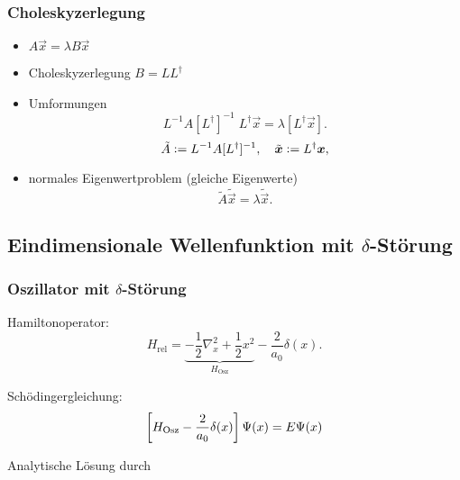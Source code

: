 \documentclass[ngerman, fleqn]{beamer}
\begin{document}
\begin{frame}
    \frametitle{Choleskyzerlegung}

    \begin{itemize}
        \item
            $A \vec x = \lambda B \vec x$

        \item
            Choleskyzerlegung $B = L L^\dagger$ 

        \item
            Umformungen
            \[
                L^{-1} A [L^\dagger]^{-1} \; L^\dagger \vec x
                =
                \lambda [L^\dagger \vec x].
            \]
            \[
                \tilde{A} := L^{-1} A [L^\dagger]^{-1}
                ,\quad
                \tilde{\boldsymbol{x}} := L^\dagger \boldsymbol{x},
            \]

        \item
            normales Eigenwertproblem (gleiche Eigenwerte)
            \[
                \tilde{A} \tilde{\vec x} = \lambda \tilde{\vec x}.
            \]
    \end{itemize}
\end{frame}

\subsection{Eindimensionale Wellenfunktion mit $\delta$-Störung}

\frame\subsectionpage

\begin{frame}
    \frametitle{Oszillator mit $\delta$-Störung}

    Hamiltonoperator:
    \[
        H_\text{rel} = \underbrace{- \frac12 \nabla_x^2 + \frac 12
        x^2}_{H_\text{Osz}} - \frac2{a_0} \delta(x).
    \]

    Schödingergleichung:
    \[
        \sbr{H_\text{Osz} - \frac2{a_0} \delta(x)} \Psi(x) = E \Psi(x)
    \]

    Analytische Lösung durch \cite{Busch/Two_Cold}
\end{frame}
\end{document}

